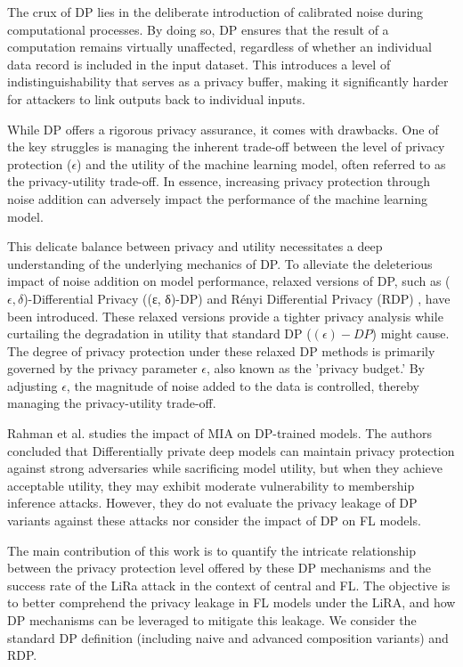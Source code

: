The crux of DP lies in the deliberate introduction of calibrated noise during computational processes. By doing so, DP ensures that the result of a computation remains virtually unaffected, regardless of whether an individual data record is included in the input dataset. This introduces a level of indistinguishability that serves as a privacy buffer, making it significantly harder for attackers to link outputs back to individual inputs.

While DP offers a rigorous privacy assurance, it comes with drawbacks. One of the key struggles is managing the inherent trade-off between the level of privacy protection ($\epsilon$) and the utility of the machine learning model, often referred to as the privacy-utility trade-off. In essence, increasing privacy protection through noise addition can adversely impact the performance of the machine learning model.

This delicate balance between privacy and utility necessitates a deep understanding of the underlying mechanics of DP. To alleviate the deleterious impact of noise addition on model performance, relaxed versions of DP, such as ($\epsilon, \delta$)-Differential Privacy ((ε, δ)-DP) \cite{dworkAlgorithmicFoundationsDifferential2014} and Rényi Differential Privacy (RDP) \cite{mironovRenyiDifferentialPrivacy2017}, have been introduced. These relaxed versions provide a tighter privacy analysis while curtailing the degradation in utility that standard DP ($(\epsilon)-DP$) might cause. The degree of privacy protection under these relaxed DP methods is primarily governed by the privacy parameter $\epsilon$, also known as the 'privacy budget.' By adjusting $\epsilon$, the magnitude of noise added to the data is controlled, thereby managing the privacy-utility trade-off.

Rahman et al. \cite{rahmanmia} studies the impact of MIA on DP-trained models. The authors concluded that Differentially private deep models can maintain privacy protection against strong adversaries while sacrificing model utility, but when they achieve acceptable utility, they may exhibit moderate vulnerability to membership inference attacks. However, they do not evaluate the privacy leakage of DP variants against these attacks nor consider the impact of DP on FL models. 

The main contribution of this work is to quantify the intricate relationship between the privacy protection level offered by these DP mechanisms and the success rate of the LiRa attack in the context of central and FL. The objective is to better comprehend the privacy leakage in FL models under the LiRA, and how DP mechanisms can be leveraged to mitigate this leakage. We consider the standard DP definition (including naive and advanced composition variants) and RDP.


